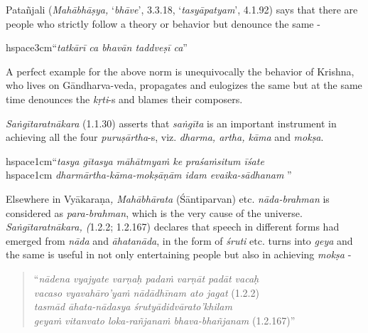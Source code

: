Patañjali (\textit{Mahābhāṣya,} ‘\textit{bhāve}’, 3.3.18, ‘\textit{tasyāpatyam}’, 4.1.92) says that there are people who strictly follow a theory or behavior but denounce the same -

\begin{myquote}
hspace{3cm}“\textit{tatkārī ca bhavān taddveṣī ca}”
\end{myquote}

A perfect example for the above norm is unequivocally the behavior of Krishna, who lives on Gāndharva-veda, propagates and eulogizes the same but at the same time denounces the \textit{kṛti}-s and blames their composers. 

\textit{Saṅgītaratnākara} (1.1.30) asserts that \textit{saṅgīta} is an important instrument in achieving all the four \textit{puruṣārtha}-s, viz. \textit{dharma, artha, kāma} and \textit{mokṣa}.

\newpage

\begin{myquote}
hspace{1cm}“\textit{tasya gītasya māhātmyaṁ ke praśaṁsitum īśate} \\hspace{1cm} \textit{dharmārtha-kāma-mokṣāṇām idam evaika-sādhanam} ”
\end{myquote}

Elsewhere in Vyākaraṇa\textit{, Mahābhārata} (Śāntiparvan) etc. \textit{nāda-brahman} is considered as \textit{para-brahman}, which is the very cause of the universe. \textit{Saṅgītaratnākara, (}1.2.2; 1.2.167) declares that speech in different forms had emerged from \textit{nāda} and \textit{āhatanāda}, in the form of \textit{śruti} etc. turns into \textit{geya} and the same is useful in not only entertaining people but also in achieving \textit{mokṣa} -

\begin{verse}
“\textit{nādena vyajyate varṇaḥ padaṁ varṇāt padāt vacaḥ} \\\textit{vacaso vyavahāro’yaṁ nādādhīnam ato jagat}  (1.2.2)\\\textit{tasmād āhata-nādasya śrutyādidvārato’khilam} \\\textit{geyaṁ vitanvato loka-rañjanaṁ bhava-bhañjanam}  (1.2.167)”
\end{verse}

